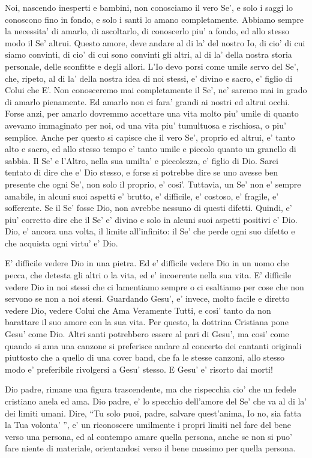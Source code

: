 Noi, nascendo inesperti e bambini, non conosciamo il vero Se', e solo i saggi lo conoscono fino in fondo, e solo i santi lo amano completamente. Abbiamo sempre la necessita' di amarlo, di ascoltarlo, di conoscerlo piu' a fondo, ed allo stesso modo il Se' altrui.  Questo amore, deve andare al di la' del nostro Io, di cio' di cui siamo convinti, di cio' di cui sono convinti gli altri, al di la' della nostra storia personale, delle sconfitte e degli allori. L'Io devo porsi come umile servo del Se', che, ripeto, al di la' della nostra idea di noi stessi, e' divino e sacro, e' figlio di Colui che E'. Non conosceremo mai completamente il Se', ne' saremo mai in grado di amarlo pienamente. Ed amarlo non ci fara' grandi ai nostri ed altrui occhi. Forse anzi, per amarlo dovremmo accettare una vita molto piu' umile di quanto avevamo immaginato per noi, od una vita piu' tumultuosa e rischiosa, o piu' semplice. Anche per questo si capisce che il vero Se', proprio ed altrui, e' tanto alto e sacro, ed allo stesso tempo e' tanto umile e piccolo quanto un granello di sabbia. Il Se' e l'Altro, nella sua umilta' e piccolezza, e' figlio di Dio. Sarei tentato di dire che e' Dio stesso, e forse si potrebbe dire se uno avesse ben presente che ogni Se', non solo il proprio, e' cosi'. Tuttavia, un Se' non e' sempre amabile, in alcuni suoi aspetti e' brutto, e' difficile, e' costoso, e' fragile, e' sofferente. Se il Se' fosse Dio, non avrebbe nessuno di questi difetti. Quindi, e' piu' corretto dire che il Se' e' divino e solo in alcuni suoi aspetti positivi e' Dio. Dio, e' ancora una volta, il limite all'infinito: il Se' che perde ogni suo difetto e che acquista ogni virtu' e' Dio. 

E' difficile vedere Dio in una pietra. Ed e' difficile vedere Dio in un uomo che pecca, che detesta gli altri o la vita, ed e' incoerente nella sua vita. E' difficile vedere Dio in noi stessi che ci lamentiamo sempre o ci esaltiamo per cose che non servono se non a noi stessi. Guardando Gesu', e' invece, molto facile e diretto vedere Dio, vedere Colui che Ama Veramente Tutti, e cosi' tanto da non barattare il suo amore con la sua vita. Per questo, la dottrina Cristiana pone Gesu' come Dio. Altri santi potrebbero essere al pari di Gesu', ma cosi' come quando si ama una canzone si preferisce andare al concerto dei cantanti originali piuttosto che a quello di una cover band, che fa le stesse canzoni, allo stesso modo e' preferibile rivolgersi a Gesu' stesso. E Gesu' e' risorto dai morti! 

Dio padre, rimane una figura trascendente, ma che rispecchia cio' che un fedele cristiano anela ed ama. Dio padre, e' lo specchio dell'amore del Se' che va al di la' dei limiti umani. Dire, ``Tu solo puoi, padre, salvare quest'anima, Io no, sia fatta la Tua volonta' '', e' un riconoscere umilmente i propri limiti nel fare del bene verso una persona, ed al contempo amare quella persona, anche se non si puo' fare niente di materiale, orientandosi verso il bene massimo per quella persona.

